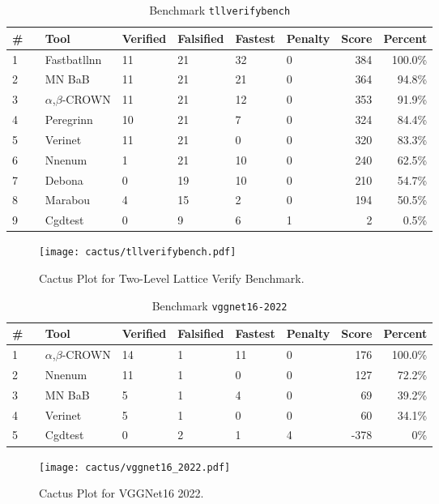 
\begin{table}[h]
\begin{center}
\caption{Benchmark \texttt{tllverifybench}} \label{tab:cat_{cat}}
{\setlength{\tabcolsep}{2pt}
\begin{tabular}[h]{@{}llllllrr@{}}
\toprule
\textbf{\# ~} & \textbf{Tool} & \textbf{Verified} & \textbf{Falsified} & \textbf{Fastest} & \textbf{Penalty} & \textbf{Score} & \textbf{Percent}\\
\midrule
1 & Fastbatllnn & 11 & 21 & 32 & 0 & 384 & 100.0\% \\
2 & MN BaB & 11 & 21 & 21 & 0 & 364 & 94.8\% \\
3 & $\alpha$,$\beta$-CROWN & 11 & 21 & 12 & 0 & 353 & 91.9\% \\
4 & Peregrinn & 10 & 21 & 7 & 0 & 324 & 84.4\% \\
5 & Verinet & 11 & 21 & 0 & 0 & 320 & 83.3\% \\
6 & Nnenum & 1 & 21 & 10 & 0 & 240 & 62.5\% \\
7 & Debona & 0 & 19 & 10 & 0 & 210 & 54.7\% \\
8 & Marabou & 4 & 15 & 2 & 0 & 194 & 50.5\% \\
9 & Cgdtest & 0 & 9 & 6 & 1 & 2 & 0.5\% \\
\bottomrule
\end{tabular}
}
\end{center}
\end{table}



\begin{figure}[h]
\centerline{\texttt{[image: cactus/tllverifybench.pdf]}}
\caption{Cactus Plot for Two-Level Lattice Verify Benchmark.}
\label{fig:quantPic}
\end{figure}



\begin{table}[h]
\begin{center}
\caption{Benchmark \texttt{vggnet16-2022}} \label{tab:cat_{cat}}
{\setlength{\tabcolsep}{2pt}
\begin{tabular}[h]{@{}llllllrr@{}}
\toprule
\textbf{\# ~} & \textbf{Tool} & \textbf{Verified} & \textbf{Falsified} & \textbf{Fastest} & \textbf{Penalty} & \textbf{Score} & \textbf{Percent}\\
\midrule
1 & $\alpha$,$\beta$-CROWN & 14 & 1 & 11 & 0 & 176 & 100.0\% \\
2 & Nnenum & 11 & 1 & 0 & 0 & 127 & 72.2\% \\
3 & MN BaB & 5 & 1 & 4 & 0 & 69 & 39.2\% \\
4 & Verinet & 5 & 1 & 0 & 0 & 60 & 34.1\% \\
5 & Cgdtest & 0 & 2 & 1 & 4 & -378 & 0\% \\
\bottomrule
\end{tabular}
}
\end{center}
\end{table}



\begin{figure}[h]
\centerline{\texttt{[image: cactus/vggnet16\_2022.pdf]}}
\caption{Cactus Plot for VGGNet16 2022.}
\label{fig:quantPic}
\end{figure}

